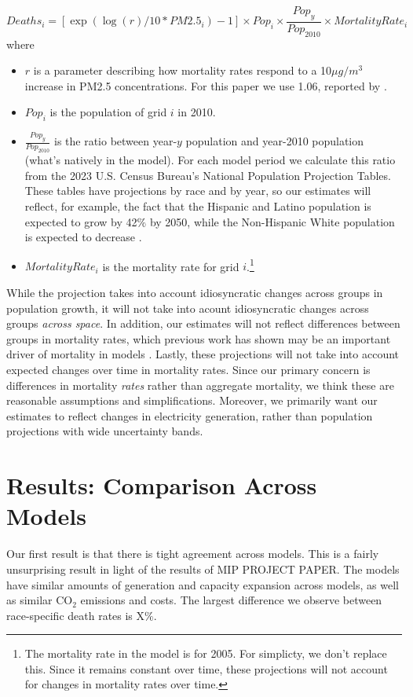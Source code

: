 \documentclass[a4paper]{article}
\theoremstyle{definition}
\theoremstyle{plain}
\begin{document}
\begin{equation}
    Deaths_i = [\exp(\log(r)/10*PM2.5_i)-1]\times Pop_i \times \frac{Pop_y}{Pop_{2010}} \times MortalityRate_i
\end{equation}
where 
\begin{itemize}
    \item $r$ is a parameter describing how mortality rates respond to a 10$\mu g/m^3$ increase in PM2.5 concentrations.  For this paper we use 1.06, reported by \citet{Krewski2009ExtendedInstitute}.
    \item $Pop_i$ is the population of grid $i$ in 2010.
    \item $\frac{Pop_y}{Pop_{2010}}$ is the ratio between year-$y$ population and year-2010 population (what's natively in the model).  For each model period we calculate this ratio from the 2023 U.S. Census Bureau's National Population Projection Tables.  These tables have projections by race and by year, so our estimates will reflect, for example, the fact that the Hispanic and Latino population is expected to grow by 42$\%$ by 2050, while the Non-Hispanic White population is expected to decrease \citep{Bureau2023Series}.
    \item $MortalityRate_i$ is the mortality rate for grid $i$.\footnote{The mortality rate in the model is for 2005.  For simplicty, we don't replace this.  Since it remains constant over time, these projections will not account for changes in mortality rates over time.}
\end{itemize}

While the projection takes into account idiosyncratic changes across groups in population growth, it will not take into acount idiosyncratic changes across groups \textit{across space}.  In addition, our estimates will not reflect differences between groups in mortality rates, which previous work has shown may be an important driver of mortality in models \citep{Spiller2021MortalityOutcomes}.  Lastly, these projections will not take into account expected changes over time in mortality rates. Since our primary concern is differences in mortality \textit{rates} rather than aggregate mortality, we think these are reasonable assumptions and simplifications. Moreover, we primarily want our estimates to reflect changes in electricity generation, rather than population projections with wide uncertainty bands.
\section{Results: Comparison Across Models}
Our first result is that there is tight agreement across models.  This is a fairly unsurprising result in light of the results of MIP PROJECT PAPER.  The models have similar amounts of generation and capacity expansion across models, as well as similar CO$_2$ emissions and costs.  The largest difference we observe between race-specific death rates is X$\%$.
\end{document}
